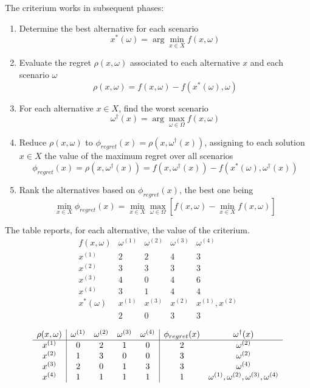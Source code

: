The criterium works in subsequent phases:
\begin{enumerate}
	\item Determine the best alternative for each scenario
	$$ x^\ast (\omega) = \arg \min_{x \in X} f(x, \omega) $$
	
	\item Evaluate the regret $\rho (x, \omega)$ associated to each alternative $x$ and each scenario $\omega$
	$$ \rho(x, \omega) = f (x, \omega)  - f(x^\ast (\omega), \omega) $$
	
	\item For each alternative $x \in X$, find the worst scenario
	$$ \omega^\dag (x) = \arg \max_{\omega \in \Omega} f (x, \omega)$$
	
	\item Reduce $\rho (x, \omega)$ to $\phi_{regret} (x) = \rho (x, \omega^\dag (x))$, assigning to each solution $x \in X$ the value of the maximum regret over all scenarios
	$$ \phi_{regret} (x) = \rho (x, \omega^\dag (x)) = f(x, \omega^\dag (x)) - f(x^\ast(\omega), \omega^\dag (x)) $$
	 
	\item Rank the alternatives based on $\phi_{regret} (x)$, the best one being
	$$ \min_{x \in X} \phi_{regret} (x) = \min_{x \in X} \max_{\omega \in \Omega} \left[f(x, \omega) - \min_{x \in X} f (x, \omega) \right] $$
\end{enumerate}

The table reports, for each alternative, the value of the criterium.
$$
\begin{array}{c|cccc}
	f(x,\omega) & \omega^{(1)} & \omega^{(2)} & \omega^{(3)} & \omega^{(4)} \\
	\hline
	x^{(1)} & 2 & 2 & 4 & 3 \\
	x^{(2)} & 3 & 3 & 3 & 3 \\
	x^{(3)} & 4 & 0 & 4 & 6 \\
	x^{(4)} & 3 & 1 & 4 & 4 \\
	\hline
	x^\ast (\omega) & x^{(1)} & x^{(3)} & x^{(2)} & x^{(1)}, x^{(2)} \\
	& 2 & 0 & 3 & 3 \\
\end{array}
$$
$$
\begin{array}{c|cccc | c c}
	\rho (x,\omega) & \omega^{(1)} & \omega^{(2)} & \omega^{(3)} & \omega^{(4)} & \phi_{regret} (x) & \omega^\dag (x)\\
	\hline
	x^{(1)} & 0 & 2 & 1 & 0 & 2 & \omega^{(2)} \\
	x^{(2)} & 1 & 3 & 0 & 0 & 3 & \omega^{(2)} \\
	x^{(3)} & 2 & 0 & 1 & 3 & 3 & \omega^{(4)} \\
	x^{(4)} & 1 & 1 & 1 & 1 & 1 & \omega^{(1)}, \omega^{(2)}, \omega^{(3)}, \omega^{(4)} \\
\end{array}
$$

